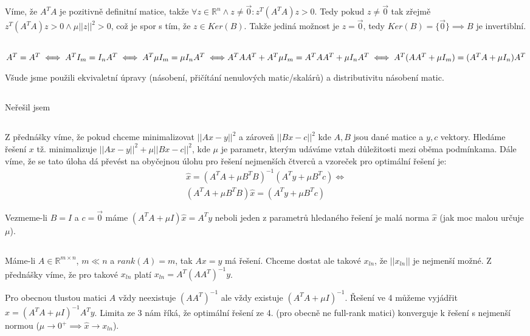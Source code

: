 \documentclass[12pt, a4paper]{article}
\begin{document}
Víme, že $A^T A$ je pozitivně definitní matice, takže $\forall z \in \mathbb{R}^n \land z \neq \vec{0}: z^T(A^T A)z > 0$. Tedy pokud $z \neq \vec{0}$ tak zřejmě $z^T(A^T A)z >0 \land  \mu||z||^2 > 0$, což je spor s tím, že $z \in Ker(B)$. Takže jediná možnost je $z=\vec{0}$, tedy $Ker(B)=\{\vec{0}\} \implies B$ je invertiblní.

\subsection{}
$A^T = A^T \iff A^T I_m = I_n A^T \iff A^T \mu I_m = \mu I_n A^T \iff\\ A^T A A^T +  A^T \mu I_m = A^T A A^T +  \mu I_n A^T \iff A^T(AA^T+\mu I_m)=(A^T A + \mu I_n) A^T$

Všude jsme použili ekvivaletní úpravy (násobení, přičítání nenulových matic/skalárů) a distributivitu násobení matic.
\subsection{}
Neřešil jsem

\subsection{}
Z přednášky víme, že pokud chceme minimalizovat $||Ax-y||^2$ a zároveň $||Bx-c||^2$ kde $A,B$ jsou dané matice a $y,c$ vektory. Hledáme řešení $x$ tž. minimalizuje $||Ax-y||^2+\mu||Bx-c||^2$, kde $\mu$ je parametr, kterým udáváme vztah důležitosti mezi oběma podmínkama. Dále víme, že se tato úloha dá převést na obyčejnou úlohu pro řešení nejmenších čtverců a vzoreček pro optimální řešení je:
\begin{gather*}
\hat{x}=(A^TA+\mu B^T B)^{-1} (A^Ty+ \mu B^Tc) \iff\\
(A^TA+\mu B^T B)\hat{x}= (A^Ty+ \mu B^Tc) 
\end{gather*}

Vezmeme-li $B=I$ a $c=\vec{0}$ máme $(A^TA+\mu I)\hat{x}= A^Ty$ neboli jeden z parametrů hledaného řešení je malá norma $\hat{x}$ (jak moc malou určuje $\mu$).

\subsection{}
Máme-li $A \in \mathbb{R}^{m \times n}$, $m \ll n$ a $rank(A)=m$, tak $Ax=y$ má řešení. Chceme dostat ale takové $x_{ln}$, že $||x_{ln}||$ je nejmenší možné. Z přednášky víme, že pro takové $x_{ln}$ platí $x_{ln}=A^T(AA^T)^{-1}y $.

Pro obecnou tlustou matici $A$ vždy neexistuje $(AA^T)^{-1}$ ale vždy existuje $(A^T A+ \mu I)^{-1}$. Řešení ve 4 můžeme vyjádřit $\hat{x} = (A^TA+\mu I)^{-1} A^Ty$. Limita ze 3 nám říká, že optimální řešení ze 4. (pro obecně ne full-rank matici) konverguje k řešení s nejmenší normou ($\mu \rightarrow 0^+ \implies \hat{x} \rightarrow x_{ln}$).
\end{document}
